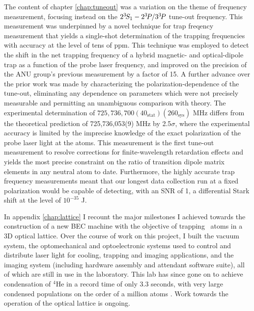 	




	The content of chapter \ref{chap:tuneout} was a variation on the theme of frequency measurement, focusing instead on the $2^{3\!}S_1- 2^{3\!}P / 3^{3\!}P$ tune-out frequency.
	This measurement was underpinned by a novel technique for trap freqency measurement that yields a single-shot determination of the trapping frequencies with accuracy at the level of tens of ppm.
	This technique was employed to detect the shift in the net trapping frequency of a hybrid magnetic- and optical-dipole trap as a function of the probe laser frequency, and improved on the precision of the ANU group's previous measurement \cite{Henson15} by a factor of 15.
	A further advance over the prior work was made by characterizing the polarization-dependence of the tune-out, eliminating any dependence on parameters which were not precisely measurable and permitting an unambiguous comparison with theory.
	The experimental determination of $725,736,700(40_\mathrm{stat})(260_\mathrm{sys})$ MHz differs from the theoretical prediction of 725,736,053(9) MHz by 2.5$\sigma$, where the experimental accuracy is limited by the imprecise knowledge of the exact polarization of the probe laser light at the atoms.
	This measurement is the first tune-out measurement to resolve corrections for finite-wavelength retardation effects and yields the most precise constraint on the ratio of transition dipole matrix elements in any neutral atom to date.
	Furthermore, the highly accurate trap frequency measurements meant that our longest data collection run at a fixed polarization would be capable of detecting, with an SNR of 1, a differential Stark shift at the level of $10^{-35}$ J.


	In appendix \ref{chap:lattice} I recount the major milestones I achieved towards the construction of a new BEC machine with the objective of trapping \mhe~atoms in a 3D optical lattice.
	Over the course of work on this project, I built the vacuum system, the optomechanical and optoelectronic systems used to control and distribute laser light for cooling, trapping and imaging applications, and the imaging system (including hardware assembly and attendant software suite), all of which are still in use in the laboratory.
	This lab has since gone on to achieve condensation of $^4$He in a record time of only 3.3 seconds, with very large condensed populations on the order of a million atoms \cite{Abbas21}.
	Work towards the operation of the optical lattice is ongoing.

